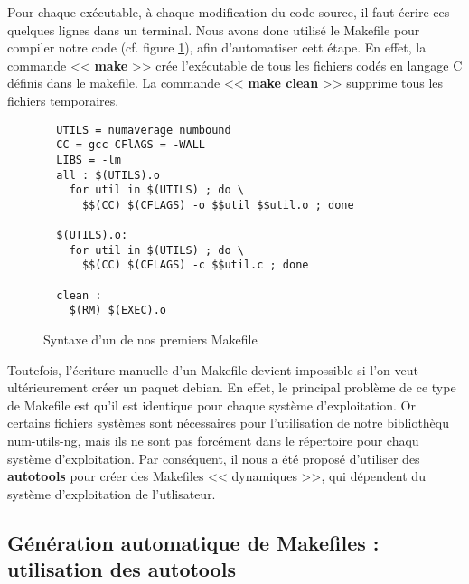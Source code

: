 Pour chaque ex\'ecutable, \`a chaque modification du code source, il faut \'ecrire ces quelques lignes dans un terminal.
Nous avons donc utilis\'e le Makefile pour compiler notre code (cf. figure \ref{fig:exemple_makefile}), afin d'automatiser cett \'etape.
En effet, la commande << \textbf{make} >> cr\'ee l'ex\'ecutable de tous les fichiers cod\'es en langage C d\'efinis dans le makefile. La commande
<< \textbf{make clean} >> supprime tous les fichiers temporaires.
\newline
\begin{figure}[h] 
\begin{center}

\begin{minipage}[|c|]{0.7\linewidth}
\begin{verbatim}
  UTILS = numaverage numbound
  CC = gcc CFlAGS = -WALL
  LIBS = -lm
  all : $(UTILS).o
    for util in $(UTILS) ; do \
      $$(CC) $(CFLAGS) -o $$util $$util.o ; done

  $(UTILS).o:
    for util in $(UTILS) ; do \
      $$(CC) $(CFLAGS) -c $$util.c ; done

  clean :
    $(RM) $(EXEC).o
\end{verbatim}
\end{minipage}
\end{center}
\caption{Syntaxe d'un de nos premiers Makefile}
\label{fig:exemple_makefile}
\end{figure}

Toutefois, l'\'ecriture manuelle d'un Makefile devient impossible si l'on veut ult\'erieurement cr\'eer un paquet debian.
En effet, le principal probl\`eme de ce type de Makefile est qu'il est identique pour chaque syst\`eme d'exploitation. Or certains fichiers
syst\`emes sont n\'ecessaires pour l'utilisation de notre biblioth\`equ num-utils-ng, mais ils ne sont pas forc\'ement dans le r\'epertoire pour
chaqu syst\`eme d'exploitation.
\newline 	
Par cons\'equent, il nous a \'et\'e propos\'e d'utiliser des \textbf{autotools} pour cr\'eer des Makefiles << dynamiques >>, qui d\'ependent du syst\`eme
d'exploitation de l'utlisateur.

\subsection{G\'en\'eration automatique de Makefiles : utilisation des autotools}

